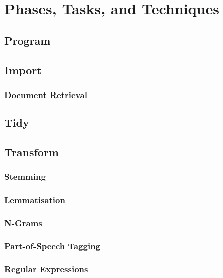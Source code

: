\documentclass[]{book}
\theoremstyle{definition}
\theoremstyle{definition}
\theoremstyle{definition}
\theoremstyle{remark}
\begin{document}
\section{Phases, Tasks, and Techniques}\label{sotatools}

\subsection{Program}\label{sotatoolsprogram}

\subsection{Import}\label{sotatoolsimport}

\subsubsection{Document Retrieval}\label{sotatoolsimportretrieval}

\subsection{Tidy}\label{sotatoolstidy}

\subsection{Transform}\label{sotatoolstransform}

\subsubsection{Stemming}\label{sotatoolstransformstemming}

\subsubsection{Lemmatisation}\label{sotatoolstransformlemmatisation}

\subsubsection{N-Grams}\label{sotatoolstransformngrams}

\subsubsection{Part-of-Speech Tagging}\label{sotatoolstransformpos}

\subsubsection{Regular Expressions}\label{sotatoolstransformregex}
\end{document}
